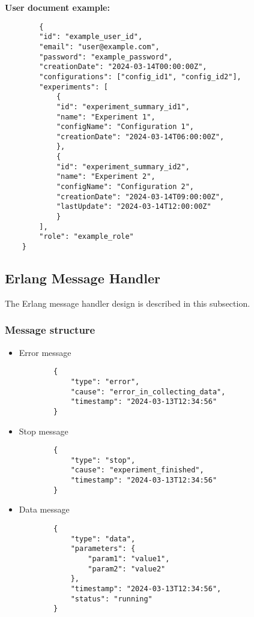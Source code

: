 \newpage
\textbf{User document example:} \begin{verbatim}
        {
        "id": "example_user_id",
        "email": "user@example.com",
        "password": "example_password",
        "creationDate": "2024-03-14T00:00:00Z",
        "configurations": ["config_id1", "config_id2"],
        "experiments": [
            {
            "id": "experiment_summary_id1",
            "name": "Experiment 1",
            "configName": "Configuration 1",
            "creationDate": "2024-03-14T06:00:00Z",
            },
            {
            "id": "experiment_summary_id2",
            "name": "Experiment 2",
            "configName": "Configuration 2",
            "creationDate": "2024-03-14T09:00:00Z",
            "lastUpdate": "2024-03-14T12:00:00Z"
            }
        ],
        "role": "example_role"
    }

    \end{verbatim}
\newpage
\subsection{Erlang Message Handler}

The Erlang message handler design is described in this subsection.

\subsubsection{Message structure}
\begin{itemize}
    \item Error message \begin{verbatim}
        {
            "type": "error",
            "cause": "error_in_collecting_data",
            "timestamp": "2024-03-13T12:34:56"
        }
    \end{verbatim}
    \item Stop message \begin{verbatim}
        {
            "type": "stop",
            "cause": "experiment_finished",
            "timestamp": "2024-03-13T12:34:56"
        }
    \end{verbatim}
    \item Data message \begin{verbatim}
        {   
            "type": "data",
            "parameters": {
                "param1": "value1",
                "param2": "value2"
            },
            "timestamp": "2024-03-13T12:34:56",
            "status": "running"
        }
    \end{verbatim}
\end{itemize}


